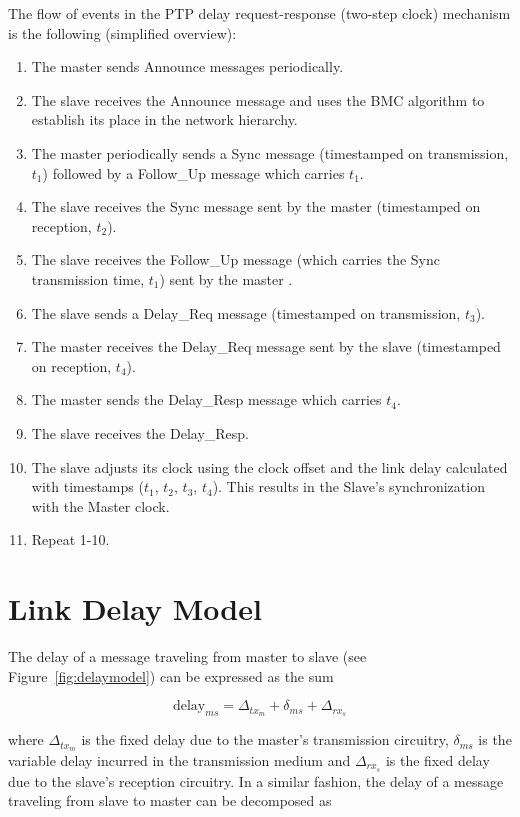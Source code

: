 \documentclass[a4paper, 12pt]{article}
\newcommand{\eqdelay}[1]{{\text{delay}}_{#1}}
\begin{document}
The flow of events in the PTP delay request-response (two-step clock) mechanism is the following 
(simplified overview): 
\begin{enumerate}
\item The master sends Announce messages periodically.
\item The slave receives the Announce message and uses the BMC algorithm to establish its place in 
      the network hierarchy.
\item The master periodically sends a Sync message (timestamped on transmission, $t_1$) followed by 
      a Follow\_Up message which carries $t_1$.
\item The slave receives the Sync message sent by the master (timestamped on reception, $t_2$).
\item The slave receives the Follow\_Up message (which carries the Sync transmission time,  
      $t_1$) sent by the master .
\item The slave sends a Delay\_Req message (timestamped on transmission, $t_3$).
\item The master receives the Delay\_Req message sent by the slave (timestamped on reception, 
      $t_4$).
\item The master sends the Delay\_Resp message which carries $t_4$.
\item The slave receives the Delay\_Resp.
\item The slave adjusts its clock using the clock offset and the link delay calculated with timestamps 
      ($t_{1}$, $t_{2}$, $t_{3}$, $t_{4}$). This results in the Slave's synchronization with the
      Master clock.
\item Repeat 1-10.
\end{enumerate}


\newpage

\section{Link Delay Model}
\label{sec:delaymodel}

The delay of a message traveling from master to slave (see Figure~\ref{fig:delaymodel}) 
can be expressed as the sum

\begin{equation}
  \label{eq:delayms}
  \eqdelay{ms} = \Delta_{tx_m} + \delta_{ms} + \Delta_{rx_s}
\end{equation}

where $\Delta_{tx_m}$ is the fixed delay due to the master's transmission
circuitry, $\delta_{ms}$ is the variable delay incurred in the
transmission medium and $\Delta_{rx_s}$ is the fixed delay due to the
slave's reception circuitry.
In a similar fashion, the delay of a message traveling from slave to
master can be decomposed as
\end{document}
